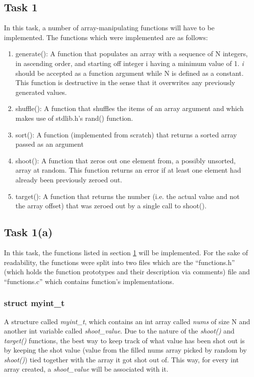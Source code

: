 \documentclass[a4paper, 12pt, titlepage]{article}
\begin{document}
\begin{onehalfspacing}
  \section{Task 1}
  \label{sec:task1}
  In this task, a number of array-manipulating functions will have to be implemented. The functions which were implemented are as follows:

  \begin{enumerate}

  \item generate(): A function that populates an array with a
      sequence of N integers, in ascending order, and starting off integer i
      having a minimum value of 1. \emph{i} should be accepted as a function
      argument while N is defined as a constant. This function is
      destructive in the sense that it overwrites any previously generated
      values.
    \item shuffle(): A function that shuffles the items of an array
      argument and which makes use of stdlib.h’s rand() function.
    \item sort(): A function (implemented from scratch) that returns a
sorted array passed as an argument
\item shoot(): A function that zeros out one element from,
  a possibly unsorted, array at random. This function returns an error
  if at least one element had already been previously zeroed out.
\item target(): A function that returns the number
  (i.e. the actual value and not the array offset) that was zeroed out
  by a single call to shoot().

  \end{enumerate}
  \pagebreak
  \subsection{Task 1(a)}
  In this task, the functions listed in section \ref{sec:task1} will
  be implemented. For the sake of readability, the functions were split
  into two files which are the ``functions.h'' (which holds the function
  prototypes and their description via comments) file and
  ``functions.c'' which contains function's implementations.



  \subsubsection{struct myint\_t}
  A structure called \emph{myint\_t}, which contains an int array called \emph{nums} of size N and another int variable called \emph{shoot\_value}.
  Due to the nature of the \emph{shoot()} and \emph{target()} functions, the best way to keep track of what value has been shot out is by keeping the shot value (value from the filled nums array picked by random by \emph{shoot()}) tied together with the array it got shot out of. This way, for every int array created, a \emph{shoot\_value} will be associated with it.


\end{onehalfspacing}
\end{document}
